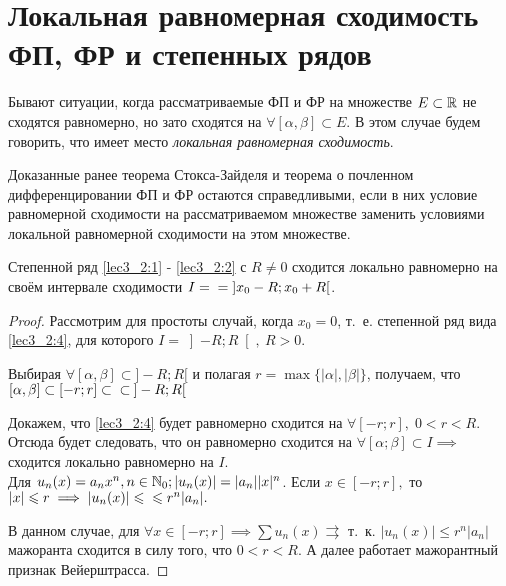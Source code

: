 \documentclass[../../main.tex]{subfiles}
\begin{document}
\section{Локальная равномерная сходимость ФП, ФР и степенных рядов}
Бывают ситуации, когда рассматриваемые ФП и ФР на множестве $E \subset \R$ 
не сходятся равномерно, но зато сходятся на $\forall [\alpha, 
\beta] \subset E$. В этом случае будем говорить, что имеет место 
\emph{локальная равномерная сходимость}.

Доказанные ранее теорема Стокса-Зайделя и теорема о почленном 
дифференцировании ФП и ФР
остаются справедливыми, если в них условие равномерной сходимости 
на рассматриваемом множестве заменить условиями 
локальной равномерной сходимости на этом множестве.

\begin{thm}
	Степенной ряд \eqref{lec3_2:1} - \eqref{lec3_2:2} с $R \ne 0 $ 
	сходится локально равномерно
	на своём интервале сходимости  $I = \\ = \; ]x_0 - R; x_0 + R[$.
\end{thm}

\begin{proof}
	Рассмотрим для простоты случай, когда $x_0 = 0$, т.~е. 
	степенной ряд вида \eqref{lec3_2:4}, для которого $I = \left]-R; R\right[,\ R 
	> 0$.
	
	Выбирая $\forall [\alpha, \beta] \subset ]-R; R[$ и полагая 
	$r = \max \{|\alpha|, |\beta|\}$, получаем, что $[\alpha, 
	\beta] \subset [-r; r] \subset \\ \subset \: ]-R; R[$
	
	Докажем, что \eqref{lec3_2:4} будет равномерно сходится на 
	$\forall [-r; r], \; 
	0 < r < R.$ Отсюда будет следовать, что он равномерно сходится на 
	$\forall [\alpha; \beta] \subset I \implies$ сходится 
	локально равномерно на $I$. \\
	Для $u_n(x) = a_n x^n, n \in \N_0; |u_n(x)| = |a_n||x|^n$. 
	Если $x \in [-r; r],$ то $|x| \le r \implies |u_n(x)| \le \\ \le r^n|a_n|.$
	
	В данном случае, для $\forall x \in [-r; r] \implies 
	\sum u_n(x) \rightrightarrows$ т.~к. $|u_n(x)| \le r^n|a_n|$ 
	мажоранта сходится в силу того, что $0 < r < R$.
	А далее работает мажорантный признак Вейерштрасса.
\end{proof}
\end{document}
